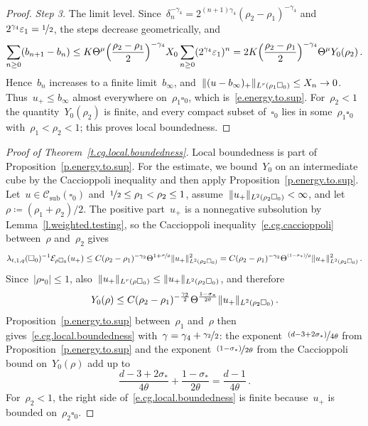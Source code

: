 \documentclass[11pt,letterpaper]{article}
\numberwithin{equation}{section}
\theoremstyle{definition}
\newcommand{\eps}{\varepsilon}
\newcommand{\nf}{\nicefrac}
\newcommand{\cu}{\square}
\DeclarePairedDelimiter{\norm}{\lVert}{\rVert}
\newcommand{\Ener}{\mathcal E}
\newcommand{\Csub}{\mathcal C_{\mathrm{sub}}}
\begin{document}
\begin{proof}
\smallskip

\emph{Step 3.} The limit level. Since~$\delta_n^{-\gamma_4}=2^{(n+1)\gamma_4}(\rho_2-\rho_1)^{-\gamma_4}$ and~$2^{\gamma_4}\eps_1=\nf12$, the steps decrease geometrically, and
\begin{equation*}
	\sum_{n\geq0}(b_{n+1}-b_n)\leq K\Theta^\mu\Bigl(\frac{\rho_2-\rho_1}2\Bigr)^{-\gamma_4}X_0\sum_{n\geq0}(2^{\gamma_4}\eps_1)^n=2K\Bigl(\frac{\rho_2-\rho_1}2\Bigr)^{-\gamma_4}\Theta^\mu Y_0(\rho_2)\,.
\end{equation*}
Hence~$b_n$ increases to a finite limit~$b_\infty$, and~$\norm{(u-b_\infty)_+}_{L^r(\rho_1\cu_0)}\leq X_n\to0$. Thus~$u_+\leq b_\infty$ almost everywhere on~$\rho_1\cu_0$, which is~\eqref{e.energy.to.sup}. For~$\rho_2<1$ the quantity~$Y_0(\rho_2)$ is finite, and every compact subset of~$\cu_0$ lies in some~$\rho_1\cu_0$ with~$\rho_1<\rho_2<1$; this proves local boundedness.
\end{proof}

\begin{proof}[Proof of Theorem~\ref{t.cg.local.boundedness}]
Local boundedness is part of Proposition~\ref{p.energy.to.sup}. For the estimate, we bound~$Y_0$ on an intermediate cube by the Caccioppoli inequality and then apply Proposition~\ref{p.energy.to.sup}. Let~$u\in\Csub(\cu_0)$ and~$\nf12\leq\rho_1<\rho_2\leq1$, assume~$\norm{u_+}_{L^2(\rho_2\cu_0)}<\infty$, and let~$\rho\coloneqq(\rho_1+\rho_2)/2$. The positive part~$u_+$ is a nonnegative subsolution by Lemma~\ref{l.weighted.testing}, so the Caccioppoli inequality~\eqref{e.cg.caccioppoli} between~$\rho$ and~$\rho_2$ gives
\begin{equation*}
	\lambda_{t,1,q}(\cu_0)^{-1}\Ener_{\rho\cu_0}(u_+)\leq C(\rho_2-\rho_1)^{-\gamma_2}\Theta^{1+\nf\sigma\theta}\norm{u_+}_{L^2(\rho_2\cu_0)}^2=C(\rho_2-\rho_1)^{-\gamma_2}\Theta^{\nf{(1-\sigma_*)}\theta}\norm{u_+}_{L^2(\rho_2\cu_0)}^2\,.
\end{equation*}
Since~$|\rho\cu_0|\leq1$, also~$\norm{u_+}_{L^r(\rho\cu_0)}\leq\norm{u_+}_{L^2(\rho_2\cu_0)}$, and therefore
\begin{equation*}
	Y_0(\rho)\leq C(\rho_2-\rho_1)^{-\frac{\gamma_2}2}\Theta^{\frac{1-\sigma_*}{2\theta}}\norm{u_+}_{L^2(\rho_2\cu_0)}\,.
\end{equation*}
Proposition~\ref{p.energy.to.sup} between~$\rho_1$ and~$\rho$ then gives~\eqref{e.cg.local.boundedness} with~$\gamma=\gamma_4+\nf{\gamma_2}2$: the exponent~$\nf{(d-3+2\sigma_*)}{4\theta}$ from Proposition~\ref{p.energy.to.sup} and the exponent~$\nf{(1-\sigma_*)}{2\theta}$ from the Caccioppoli bound on~$Y_0(\rho)$ add up to
\begin{equation*}
	\frac{d-3+2\sigma_*}{4\theta}+\frac{1-\sigma_*}{2\theta}=\frac{d-1}{4\theta}\,.
\end{equation*}
For~$\rho_2<1$, the right side of~\eqref{e.cg.local.boundedness} is finite because~$u_+$ is bounded on~$\rho_2\cu_0$.
\end{proof}
\end{document}
